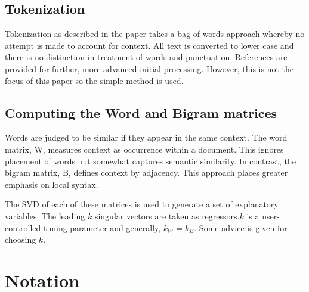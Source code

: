\documentclass[11pt]{report}
\begin{document}
\subsection{Tokenization}

Tokenization as described in the paper takes a bag of words approach whereby no attempt is made to account for context. All text is converted to lower case and there is no distinction in treatment of words and punctuation. References are provided for further, more advanced initial processing. However, this is not the focus of this paper so the simple method is used.

\subsection{Computing the Word and Bigram matrices}

Words are judged to be similar if they appear in the same context. The word matrix, W, measures context as occurrence within a document. This ignores placement of words but somewhat captures semantic similarity. In contrast, the bigram matrix, B, defines context by adjacency. This approach places greater emphasis on local syntax.

The SVD of each of these matrices is used to generate a set of explanatory variables. The leading $k$ singular vectors are taken as regressors.$k$ is a user-controlled tuning parameter and generally, $k_W = k_B$. Some advice is given for choosing $k$.

\section* { Notation}
\end{document}
